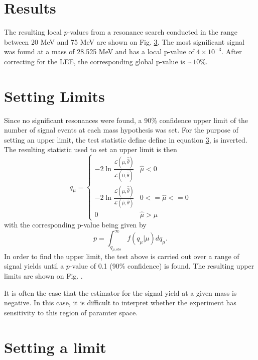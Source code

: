 
\section{Results}

The resulting local $p$-values from a resonance search conducted in the range 
between 20 MeV and 75 MeV are shown on Fig. \ref{}.  The most significant signal
was found at a mass of 28.525 MeV and has a local p-value of $4 \times 10^{-3}$.
After correcting for the LEE, the corresponding global p-value is 
$\sim 10\%$.


\section{Setting Limits}

Since no significant resonances were found, a 90\% confidence upper limit of the number
of signal events at each mass hypothesis was set.  For the purpose of setting
an upper limit, the test statistic define define in equation \ref{}, is inverted.
The resulting statistic used to set an upper limit is then
\begin{equation}
    q_{\mu} = \begin{cases}
        -2 \ln \frac{\mathcal{L}(\mu, \hat{\hat{\theta}})}{\mathcal{L}(0, \hat{\hat{\theta}})} 
            & \hat{\mu} < 0 \\
        -2 \ln \frac{\mathcal{L}(\mu, \hat{\hat{\theta}})}{\mathcal{L}(\hat{\mu}, \hat{\theta})} 
            & 0 <= \hat{\mu} <= 0 \\
             0  & \hat{\mu} > \mu
        \end{cases}
\end{equation}
with the corresponding p-value being given by
\begin{equation}
    p = \int_{q_{\mu,obs}}^{\infty} f(q_{\mu} | \mu) dq_{\mu}.
\end{equation}
In order to find the upper limit, the test above is carried out over a range of
signal yields until a $p$-value of 0.1 (90\% confidence) is found.  The resulting
upper limits are shown on Fig. {}. 

It is often the case that the estimator for the signal yield at a given mass 
is negative.  In this case, it is difficult to interpret whether the experiment
has sensitivity to this region of paramter space.

\section{Setting a limit \epsilon}





